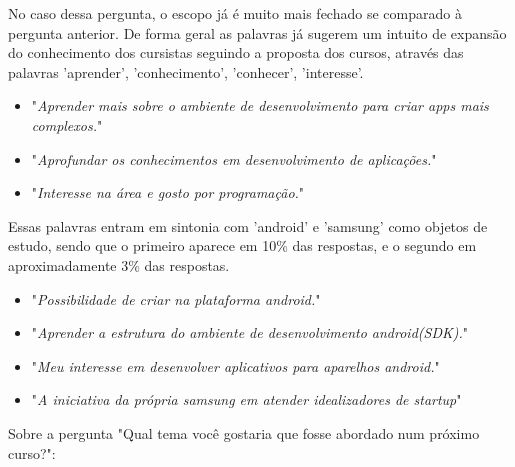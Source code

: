 No caso dessa pergunta, o escopo já é muito mais fechado se comparado à pergunta anterior. De forma geral as palavras já sugerem um intuito de expansão do conhecimento dos cursistas seguindo a proposta dos cursos, através das palavras 'aprender', 'conhecimento', 'conhecer', 'interesse'.

\begin{itemize}
\item "\textit{Aprender mais sobre o ambiente de desenvolvimento para criar apps mais complexos.}"
\item "\textit{Aprofundar os conhecimentos em desenvolvimento de aplicações.}"
\item "\textit{Interesse na área e gosto por programação.}"
\end{itemize}

Essas palavras entram em sintonia com 'android' e 'samsung' como objetos de estudo, sendo que o primeiro aparece em 10\% das respostas, e o segundo em aproximadamente 3\% das respostas. 

\begin{itemize}
\item "\textit{Possibilidade de criar na plataforma android.}"
\item "\textit{Aprender a estrutura do ambiente de desenvolvimento android(SDK).}"
\item "\textit{Meu interesse em desenvolver aplicativos para aparelhos android.}"
\item "\textit{A iniciativa da própria samsung em atender idealizadores de startup}"
\end{itemize}


Sobre a pergunta "Qual tema você gostaria que fosse abordado num próximo curso?":

